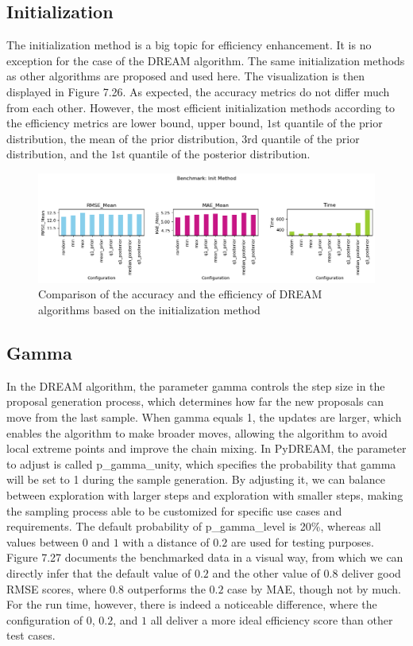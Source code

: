 \subsection{Initialization}
The initialization method is a big topic for efficiency enhancement. It is no exception for the case of the DREAM algorithm. The same initialization methods as other algorithms are proposed and used here. The visualization is then displayed in Figure 7.26. As expected, the accuracy metrics do not differ much from each other. However, the most efficient initialization methods according to the efficiency metrics are lower bound, upper bound, $1$st quantile of the prior distribution, the mean of the prior distribution, $3$rd quantile of the prior distribution, and the $1$st quantile of the posterior distribution.
\begin{figure}[H]
    \centering
    \includegraphics[width=1\textwidth]{figures/dream/init.png}
    \captionsetup{width=.8\textwidth}
    \caption{Comparison of the accuracy and the efficiency of DREAM algorithms based on the initialization method}
    \label{fig:enter-label}
\end{figure}


\subsection{Gamma}
In the DREAM  algorithm, the parameter gamma controls the step size in the proposal generation process, which determines how far the new proposals can move from the last sample. When gamma equals 1, the updates are larger, which enables the algorithm to make broader moves, allowing the algorithm to avoid local extreme points and improve the chain mixing. In PyDREAM, the parameter to adjust is called p\_gamma\_unity, which specifies the probability that gamma will be set to 1 during the sample generation. By adjusting it, we can balance between exploration with larger steps and exploration with smaller steps, making the sampling process able to be customized for specific use cases and requirements. The default probability of p\_gamma\_level is 20\%, whereas all values between $0$ and $1$ with a distance of $0.2$ are used for testing purposes. Figure 7.27 documents the benchmarked data in a visual way, from which we can directly infer that the default value of $0.2$ and the other value of $0.8$ deliver good RMSE scores, where $0.8$ outperforms the $0.2$ case by MAE, though not by much. For the run time, however, there is indeed a noticeable difference, where the configuration of $0$, $0.2$, and $1$ all deliver a more ideal efficiency score than other test cases.

